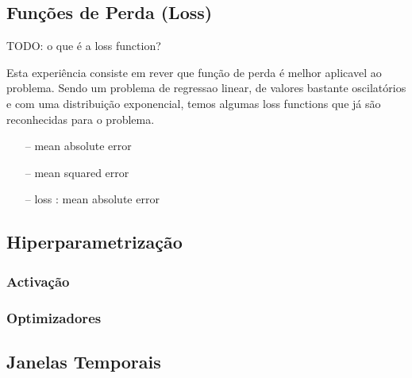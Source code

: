 \subsection{Funções de Perda (Loss)}

TODO: o que é a loss function?

Esta experiência consiste em rever que função de perda é melhor aplicavel ao problema. Sendo um problema de regressao linear, de valores bastante oscilatórios e com uma distribuição exponencial, temos algumas loss functions que já são reconhecidas para o problema.\\



\begin{itemize}
    \item[--] mean absolute error
    \item[--] mean squared error    
    \item[--] loss : mean absolute error

\end{itemize}



\subsection{Hiperparametrização}

\subsubsection{Activação}

\subsubsection{Optimizadores}

\subsection{Janelas Temporais}

